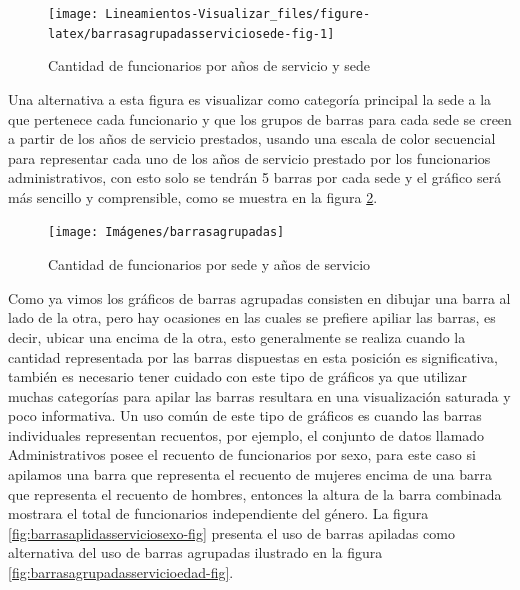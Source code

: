 \documentclass[
]{book}
\begin{document}
\begin{figure}

{\centering \texttt{[image: Lineamientos-Visualizar\_files/figure-latex/barrasagrupadasserviciosede-fig-1]} 

}

\caption{Cantidad de funcionarios por años de servicio y sede}\label{fig:barrasagrupadasserviciosede-fig}
\end{figure}

Una alternativa a esta figura es visualizar como categoría principal la sede a la que pertenece cada funcionario y que los grupos de barras para cada sede se creen a partir de los años de servicio prestados, usando una escala de color secuencial para representar cada uno de los años de servicio prestado por los funcionarios administrativos, con esto solo se tendrán 5 barras por cada sede y el gráfico será más sencillo y comprensible, como se muestra en la figura \ref{fig:barrasagrupadassedeservicio-fig}.

\begin{figure}

{\centering \texttt{[image: Imágenes/barrasagrupadas]} 

}

\caption{Cantidad de funcionarios por sede y años de servicio}\label{fig:barrasagrupadassedeservicio-fig}
\end{figure}

Como ya vimos los gráficos de barras agrupadas consisten en dibujar una barra al lado de la otra, pero hay ocasiones en las cuales se prefiere apiliar las barras, es decir, ubicar una encima de la otra, esto generalmente se realiza cuando la cantidad representada por las barras dispuestas en esta posición es significativa, también es necesario tener cuidado con este tipo de gráficos ya que utilizar muchas categorías para apilar las barras resultara en una visualización saturada y poco informativa. Un uso común de este tipo de gráficos es cuando las barras individuales representan recuentos, por ejemplo, el conjunto de datos llamado Administrativos posee el recuento de funcionarios por sexo, para este caso si apilamos una barra que representa el recuento de mujeres encima de una barra que representa el recuento de hombres, entonces la altura de la barra combinada mostrara el total de funcionarios independiente del género. La figura \ref{fig:barrasaplidasserviciosexo-fig} presenta el uso de barras apiladas como alternativa del uso de barras agrupadas ilustrado en la figura \ref{fig:barrasagrupadasservicioedad-fig}.
\end{document}
